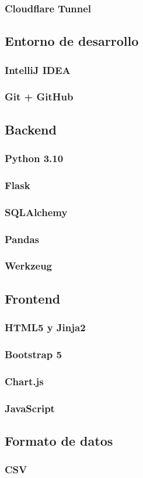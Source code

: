 \subsubsection{Cloudflare Tunnel}

\subsection{Entorno de desarrollo}

\subsubsection{IntelliJ IDEA}
\subsubsection{Git + GitHub}

\subsection{Backend}

\subsubsection{Python 3.10}
\subsubsection{Flask}
\subsubsection{SQLAlchemy}
\subsubsection{Pandas}
\subsubsection{Werkzeug}

\subsection{Frontend}

\subsubsection{HTML5 y Jinja2}
\subsubsection{Bootstrap 5}
\subsubsection{Chart.js}
\subsubsection{JavaScript}

\subsection{Formato de datos}

\subsubsection{CSV}